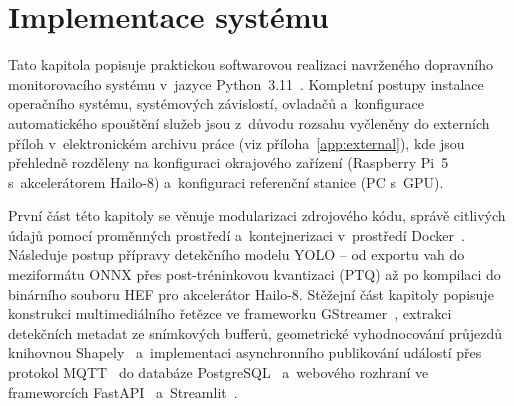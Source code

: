\chapter{Implementace systému}
Tato kapitola popisuje praktickou softwarovou realizaci navrženého dopravního monitorovacího systému v~jazyce Python~3.11~\cite{python_docs_313_2025}. Kompletní postupy instalace operačního systému, systémových závislostí, ovladačů a~konfigurace automatického spouštění služeb jsou z~důvodu rozsahu vyčleněny do externích příloh v~elektronickém archivu práce (viz příloha~\ref{app:external}), kde jsou přehledně rozděleny na konfiguraci okrajového zařízení (Raspberry Pi~5 s~akcelerátorem Hailo-8) a~konfiguraci referenční stanice (PC s~\acs{GPU}).

První část této kapitoly se věnuje modularizaci zdrojového kódu, správě citlivých údajů pomocí proměnných prostředí a~kontejnerizaci v~prostředí Docker~\cite{docker_docs}. Následuje postup přípravy detekčního modelu \acs{YOLO} – od exportu vah do meziformátu \acs{ONNX} přes post-tréninkovou kvantizaci (\acs{PTQ}) až po kompilaci do binárního souboru \acs{HEF} pro akcelerátor Hailo-8. Stěžejní část kapitoly popisuje konstrukci multimediálního řetězce ve frameworku GStreamer~\cite{gstreamer_docs}, extrakci detekčních metadat ze snímkových bufferů, geometrické vyhodnocování průjezdů knihovnou Shapely~\cite{shapely_docs} a~implementaci asynchronního publikování událostí přes protokol \acs{MQTT}~\cite{mqtt_oasis_2019} do databáze PostgreSQL~\cite{psycopg_docs_2025} a~webového rozhraní ve frameworcích FastAPI~\cite{fastapi_docs} a~Streamlit~\cite{streamlit_docs}.


